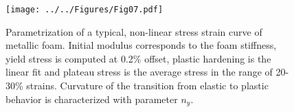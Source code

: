\documentclass[review]{elsarticle}
\begin{document}
\begin{figure}[htbp]
	\begin{center}
		\texttt{[image: ../../Figures/Fig07.pdf]}
		\caption{Parametrization of a typical, non-linear stress strain curve of metallic foam. Initial modulus corresponds to the foam stiffness, yield stress is computed at 0.2\% offset, plastic hardening is the linear fit and plateau stress is the average stress in the range of 20-30\% strains. Curvature of the transition from elastic to plastic behavior is characterized with parameter $n_y$.}
		\label{fig:MetFoaBeh}
	\end{center}
\end{figure}
\end{document}

